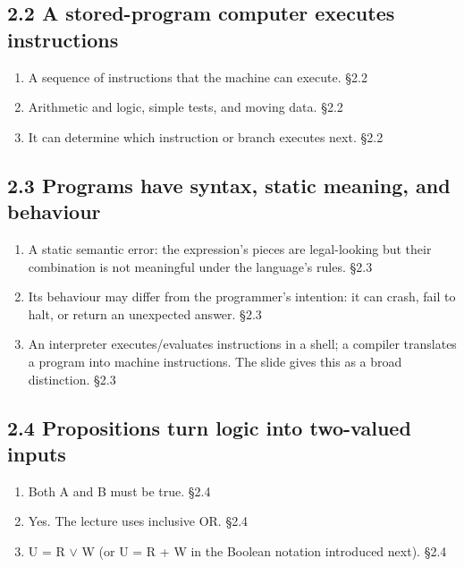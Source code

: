 \documentclass[11pt]{article}
\begin{document}
\begin{keepsection}\subsection{2.2 A stored-program computer executes instructions}

\begin{enumerate}
\item A sequence of instructions that the machine can execute. \hfill{\small\color{FAUblue}§2.2}
\item Arithmetic and logic, simple tests, and moving data. \hfill{\small\color{FAUblue}§2.2}
\item It can determine which instruction or branch executes next. \hfill{\small\color{FAUblue}§2.2}
\end{enumerate}

\end{keepsection}
\begin{keepsection}\subsection{2.3 Programs have syntax, static meaning, and behaviour}

\begin{enumerate}
\item A static semantic error: the expression's pieces are legal-looking but their combination is not meaningful under the language's rules. \hfill{\small\color{FAUblue}§2.3}
\item Its behaviour may differ from the programmer's intention: it can crash, fail to halt, or return an unexpected answer. \hfill{\small\color{FAUblue}§2.3}
\item An interpreter executes/evaluates instructions in a shell; a compiler translates a program into machine instructions. The slide gives this as a broad distinction. \hfill{\small\color{FAUblue}§2.3}
\end{enumerate}

\end{keepsection}
\begin{keepsection}\subsection{2.4 Propositions turn logic into two-valued inputs}

\begin{enumerate}
\item Both A and B must be true. \hfill{\small\color{FAUblue}§2.4}
\item Yes. The lecture uses inclusive OR. \hfill{\small\color{FAUblue}§2.4}
\item U = R \ensuremath{\lor} W (or U = R + W in the Boolean notation introduced next). \hfill{\small\color{FAUblue}§2.4}
\end{enumerate}

\end{keepsection}
\end{document}
